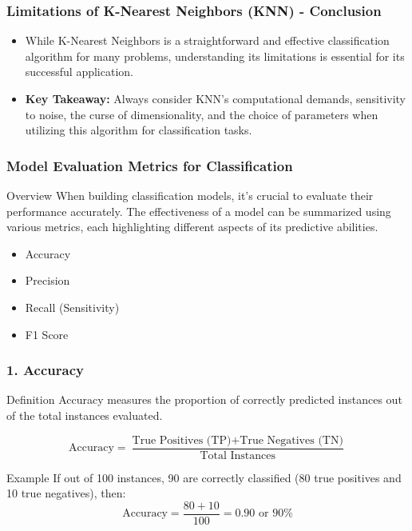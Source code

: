 \documentclass[aspectratio=169]{beamer}
\begin{document}
\begin{frame}[fragile]
    \frametitle{Limitations of K-Nearest Neighbors (KNN) - Conclusion}
    \begin{itemize}
        \item While K-Nearest Neighbors is a straightforward and effective classification algorithm for many problems, understanding its limitations is essential for its successful application.
        \item \textbf{Key Takeaway:} Always consider KNN's computational demands, sensitivity to noise, the curse of dimensionality, and the choice of parameters when utilizing this algorithm for classification tasks.
    \end{itemize}
\end{frame}

\begin{frame}[fragile]
    \frametitle{Model Evaluation Metrics for Classification}
    \begin{block}{Overview}
        When building classification models, it’s crucial to evaluate their performance accurately. The effectiveness of a model can be summarized using various metrics, each highlighting different aspects of its predictive abilities.
    \end{block}
    \begin{itemize}
        \item Accuracy
        \item Precision
        \item Recall (Sensitivity)
        \item F1 Score
    \end{itemize}
\end{frame}

\begin{frame}[fragile]
    \frametitle{1. Accuracy}
    \begin{block}{Definition}
        Accuracy measures the proportion of correctly predicted instances out of the total instances evaluated.
    \end{block}
    \begin{equation}
        \text{Accuracy} = \frac{\text{True Positives (TP)} + \text{True Negatives (TN)}}{\text{Total Instances}}
    \end{equation}
    \begin{block}{Example}
        If out of 100 instances, 90 are correctly classified (80 true positives and 10 true negatives), then:
        \begin{equation}
            \text{Accuracy} = \frac{80 + 10}{100} = 0.90 \text{ or } 90\%
        \end{equation}
    \end{block}
\end{frame}
\end{document}
